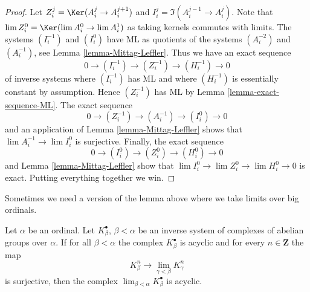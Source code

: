 \begin{proof}
Let $Z^j_i = \Ker(A^j_i \to A^{j + 1}_i)$ and
$I^j_i = \Im(A^{j - 1}_i \to A^j_i)$.
Note that $\lim Z^0_i = \Ker(\lim A^0_i \to \lim A^1_i)$ as
taking kernels commutes with limits.
The systems $(I^{-1}_i)$ and $(I^0_i)$ have ML as quotients of
the systems $(A^{-2}_i)$ and $(A^{-1}_i)$, see
Lemma \ref{lemma-Mittag-Leffler}.
Thus we have an exact sequence
$$
0 \to (I^{-1}_i) \to (Z^{-1}_i) \to (H^{-1}_i) \to 0
$$
of inverse systems where $(I^{-1}_i)$ has ML
and where $(H^{-1}_i)$ is essentially constant by assumption.
Hence $(Z^{-1}_i)$ has ML by
Lemma \ref{lemma-exact-sequence-ML}.
The exact sequence
$$
0 \to (Z^{-1}_i) \to (A^{-1}_i) \to (I^0_i) \to 0
$$
and an application of
Lemma \ref{lemma-Mittag-Leffler}
shows that $\lim A^{-1}_i \to \lim I^0_i$ is surjective.
Finally, the exact sequence
$$
0 \to (I^0_i) \to (Z^0_i) \to (H^0_i) \to 0
$$
and
Lemma \ref{lemma-Mittag-Leffler}
show that $\lim I^0_i \to \lim Z^0_i \to \lim H^0_i \to 0$
is exact. Putting everything together we win.
\end{proof}

\noindent
Sometimes we need a version of the lemma above where we take limits
over big ordinals.

\begin{lemma}
\label{lemma-ML-over-ordinals}
Let $\alpha$ be an ordinal. Let $K_\beta^\bullet$, $\beta < \alpha$
be an inverse system of complexes of abelian groups over $\alpha$. If
for all $\beta < \alpha$ the complex $K_\beta^\bullet$ is acyclic and
for every $n \in \mathbf{Z}$ the map
$$
K^n_\beta \longrightarrow \lim_{\gamma < \beta} K^n_\gamma
$$
is surjective, then the complex
$\lim_{\beta < \alpha} K_\beta^\bullet$ is acyclic.
\end{lemma}

